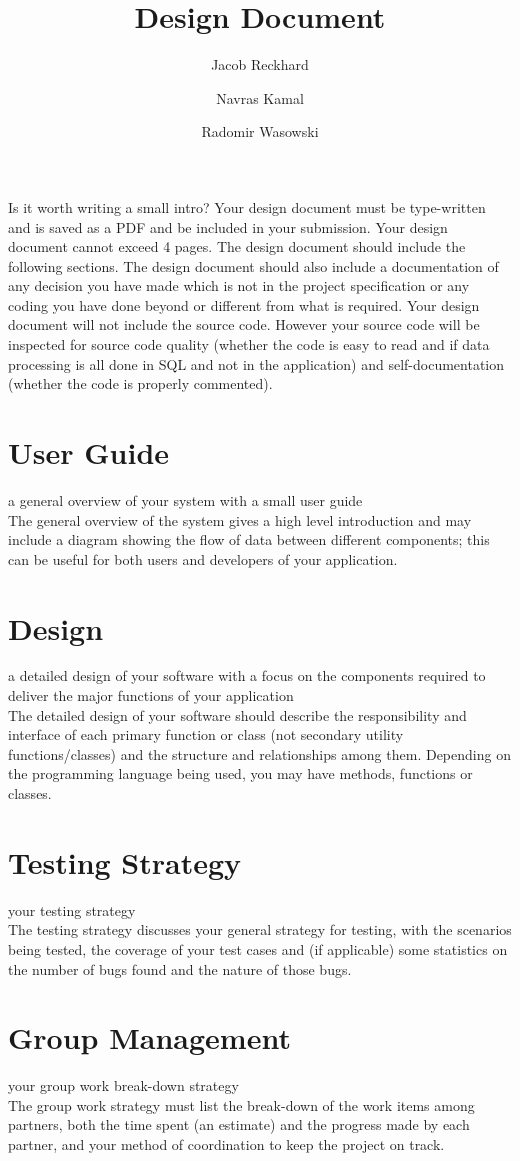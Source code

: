\documentclass{article}
\title{Design Document}
\author{Jacob Reckhard \and Navras Kamal \and Radomir Wasowski}
\begin{document}
\maketitle

Is it worth writing a small intro? Your design document must be type-written and is saved as a PDF and be included in your submission. Your design document cannot exceed 4 pages. The design document should include the following sections. The design document should also include a documentation of any decision you have made which is not in the project specification or any coding you have done beyond or different from what is required. Your design document will not include the source code. However your source code will be inspected for source code quality (whether the code is easy to read and if data processing is all done in SQL and not in the application) and self-documentation (whether the code is properly commented).

\section{User Guide}
a general overview of your system with a small user guide\\
The general overview of the system gives a high level introduction and may include a diagram showing the flow of data between different components; this can be useful for both users and developers of your application.

\section{Design}
a detailed design of your software with a focus on the components required to deliver the major functions of your application\\
The detailed design of your software should describe the responsibility and interface of each primary function or class (not secondary utility functions/classes) and the structure and relationships among them. Depending on the programming language being used, you may have methods, functions or classes.

\section{Testing Strategy}
your testing strategy\\
The testing strategy discusses your general strategy for testing, with the scenarios being tested, the coverage of your test cases and (if applicable) some statistics on the number of bugs found and the nature of those bugs.

\section{Group Management}
your group work break-down strategy\\
The group work strategy must list the break-down of the work items among partners, both the time spent (an estimate) and the progress made by each partner, and your method of coordination to keep the project on track.
\end{document}
